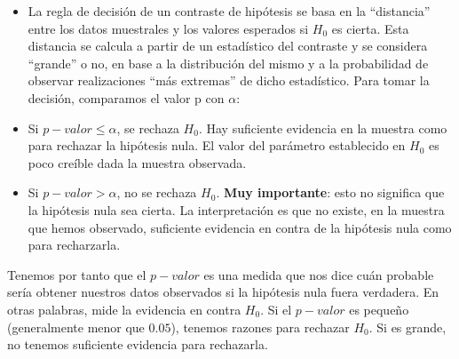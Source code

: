 \documentclass[
  letterpaper,
  DIV=11,
  numbers=noendperiod]{scrreprt}
\providecommand{\tightlist}{%
  \setlength{\itemsep}{0pt}\setlength{\parskip}{0pt}}\usepackage{longtable,booktabs,array}
\begin{document}
\begin{enumerate}
  \begin{itemize}
  \tightlist
  \item
    La regla de decisión de un contraste de hipótesis se basa en la
    ``distancia'' entre los datos muestrales y los valores esperados si
    \(H_0\) es cierta. Esta distancia se calcula a partir de un
    estadístico del contraste y se considera ``grande'' o no, en base a
    la distribución del mismo y a la probabilidad de observar
    realizaciones ``más extremas'' de dicho estadístico. Para tomar la
    decisión, comparamos el valor p con \(\alpha\):
  \item
    Si \(p-valor \leq \alpha\), se rechaza \(H_0\). Hay suficiente
    evidencia en la muestra como para rechazar la hipótesis nula. El
    valor del parámetro establecido en \(H_0\) es poco creíble dada la
    muestra observada.
  \item
    Si \(p-valor > \alpha\), no se rechaza \(H_0\). \textbf{Muy
    importante}: esto no significa que la hipótesis nula sea cierta. La
    interpretación es que no existe, en la muestra que hemos observado,
    suficiente evidencia en contra de la hipótesis nula como para
    recharzarla.
  \end{itemize}
\end{enumerate}

Tenemos por tanto que el \(p-valor\) es una medida que nos dice cuán
probable sería obtener nuestros datos observados si la hipótesis nula
fuera verdadera. En otras palabras, mide la evidencia en contra \(H_0\).
Si el \(p-valor\) es pequeño (generalmente menor que \(0.05\)), tenemos
razones para rechazar \(H_0\). Si es grande, no tenemos suficiente
evidencia para rechazarla.
\end{document}
